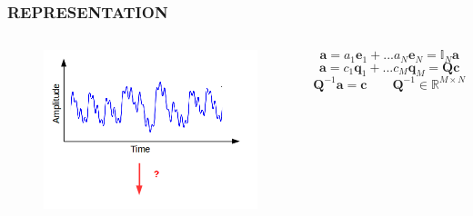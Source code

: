 \documentclass{beamer}
\begin{document}
\begin{frame}
\frametitle{REPRESENTATION}
\begin{columns}[c]
\begin{figure}
\includegraphics[width=\textwidth]{rep}
\end{figure}
\[
\textbf{a} = a_{1}\textbf{e}_{1} + ... a_{N}\textbf{e}_{N} = \mathbb{I}_{N}\textbf{a}
\]
\[
\textbf{a} = c_{1}\textbf{q}_{1} + ... c_{M}\textbf{q}_{M} = \textbf{Q}\textbf{c}
\]
\pause
\[
\textbf{Q}^{-1}\textbf{a} = \textbf{c} \qquad \textbf{Q}^{-1} \in \mathbb{R}^{M \times N}
\]
\end{columns}
\end{frame}
\end{document}
